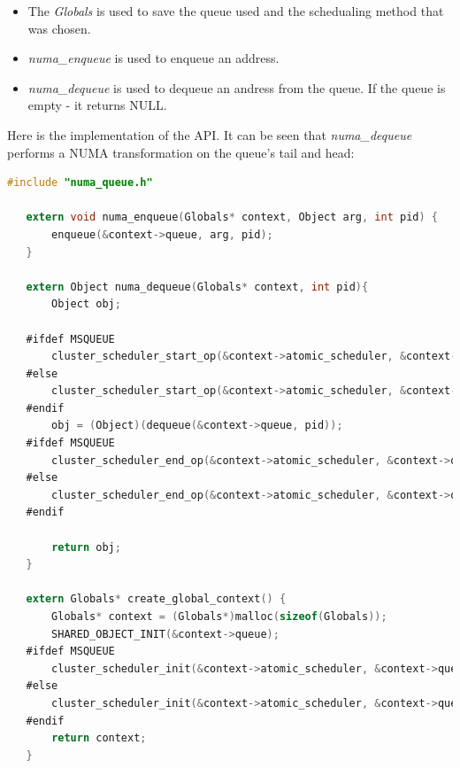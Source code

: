 \documentclass{article}
\begin{document}
 \begin{itemize}
   \item The \textit{Globals} is used to save the queue used and the schedualing method that was chosen.
   \item \textit{numa\_enqueue} is used to enqueue an address.
   \item \textit{numa\_dequeue} is used to dequeue an andress from the queue. If the queue is empty - it returns NULL.
 \end{itemize}

 Here is the implementation of the API. It can be seen that \textit{numa\_dequeue} performs a NUMA transformation on the queue's tail and head:

 \begin{lstlisting}[language=C]
   #include "numa_queue.h"
   
   extern void numa_enqueue(Globals* context, Object arg, int pid) {
       enqueue(&context->queue, arg, pid);
   }
   
   extern Object numa_dequeue(Globals* context, int pid){
       Object obj;
   
   #ifdef MSQUEUE
       cluster_scheduler_start_op(&context->atomic_scheduler, &context->queue.Head);
   #else
       cluster_scheduler_start_op(&context->atomic_scheduler, &context->queue.Head->head);
   #endif
       obj = (Object)(dequeue(&context->queue, pid));
   #ifdef MSQUEUE
       cluster_scheduler_end_op(&context->atomic_scheduler, &context->queue.Tail);
   #else
       cluster_scheduler_end_op(&context->atomic_scheduler, &context->queue.Tail->tail);
   #endif
       
       return obj;
   }
   
   extern Globals* create_global_context() {
       Globals* context = (Globals*)malloc(sizeof(Globals));
       SHARED_OBJECT_INIT(&context->queue);
   #ifdef MSQUEUE
       cluster_scheduler_init(&context->atomic_scheduler, &context->queue.Head, &context->queue.Tail);
   #else
       cluster_scheduler_init(&context->atomic_scheduler, &context->queue.Head->head, &context->queue.Tail->tail);
   #endif
       return context;
   }
 \end{lstlisting}
\end{document}
